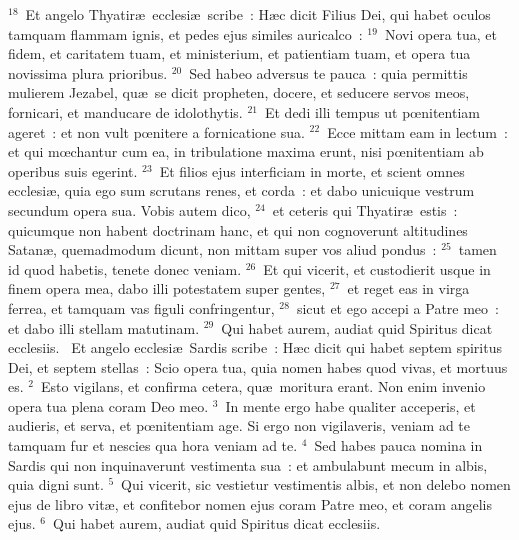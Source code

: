 ${}^{18}$~Et angelo Thyatir\ae\ ecclesi\ae\ scribe~: H\ae c dicit Filius Dei, qui habet oculos tamquam flammam ignis, et pedes ejus similes auricalco~:
${}^{19}$~Novi opera tua, et fidem, et caritatem tuam, et ministerium, et patientiam tuam, et opera tua novissima plura prioribus.
${}^{20}$~Sed habeo adversus te pauca~: quia permittis mulierem Jezabel, qu\ae\ se dicit propheten, docere, et seducere servos meos, fornicari, et manducare de idolothytis.
${}^{21}$~Et dedi illi tempus ut pœnitentiam ageret~: et non vult pœnitere a fornicatione sua.
${}^{22}$~Ecce mittam eam in lectum~: et qui mœchantur cum ea, in tribulatione maxima erunt, nisi pœnitentiam ab operibus suis egerint.
${}^{23}$~Et filios ejus interficiam in morte, et scient omnes ecclesi\ae , quia ego sum scrutans renes, et corda~: et dabo unicuique vestrum secundum opera sua. Vobis autem dico,
${}^{24}$~et ceteris qui Thyatir\ae\ estis~: quicumque non habent doctrinam hanc, et qui non cognoverunt altitudines Satan\ae , quemadmodum dicunt, non mittam super vos aliud pondus~:
${}^{25}$~tamen id quod habetis, tenete donec veniam.
${}^{26}$~Et qui vicerit, et custodierit usque in finem opera mea, dabo illi potestatem super gentes,
${}^{27}$~et reget eas in virga ferrea, et tamquam vas figuli confringentur,
${}^{28}$~sicut et ego accepi a Patre meo~: et dabo illi stellam matutinam.
${}^{29}$~Qui habet aurem, audiat quid Spiritus dicat ecclesiis.
~Et angelo ecclesi\ae\ Sardis scribe~: H\ae c dicit qui habet septem spiritus Dei, et septem stellas~: Scio opera tua, quia nomen habes quod vivas, et mortuus es.
${}^{2}$~Esto vigilans, et confirma cetera, qu\ae\ moritura erant. Non enim invenio opera tua plena coram Deo meo.
${}^{3}$~In mente ergo habe qualiter acceperis, et audieris, et serva, et pœnitentiam age. Si ergo non vigilaveris, veniam ad te tamquam fur et nescies qua hora veniam ad te.
${}^{4}$~Sed habes pauca nomina in Sardis qui non inquinaverunt vestimenta sua~: et ambulabunt mecum in albis, quia digni sunt.
${}^{5}$~Qui vicerit, sic vestietur vestimentis albis, et non delebo nomen ejus de libro vit\ae , et confitebor nomen ejus coram Patre meo, et coram angelis ejus.
${}^{6}$~Qui habet aurem, audiat quid Spiritus dicat ecclesiis.


